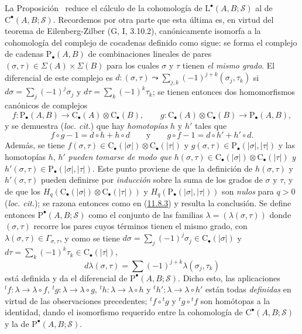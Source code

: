 \begin{env}[11.8.6]
\label{0.11.8.6}
\label{0.11.8.6-fr}
La Proposición~ reduce el cálculo de la cohomología de
$\mathrm L^\bullet(A,B;\mathscr S)$ al de
$\mathrm C^\bullet(A,B;\mathscr S)$. Recordemos por otra parte que esta última es, en virtud del teorema de Eilenberg-Zilber (G, I, 3.10.2), canónicamente isomorfa a la cohomología del complejo de cocadenas definido como sigue: se forma el complejo de cadenas $\mathrm P_\bullet(A,B)$ de combinaciones lineales de pares
$(\sigma,\tau)\in\Sigma(A)\times\Sigma(B)$ para los cuales $\sigma$ y
$\tau$ tienen \emph{el mismo grado}.
El diferencial de este complejo es
$d:(\sigma,\tau)\leadsto\sum_{j,k}(-1)^{j+k}(\sigma_j,\tau_k)$ si $d\sigma=\sum_j(-1)^j\sigma_j$ y $d\tau=\sum_k(-1)^k\tau_k$; se tienen entonces dos homomorfismos canónicos de complejos
\[
f:\mathrm P_\bullet(A,B)\longrightarrow
\mathrm C_\bullet(A)\otimes\mathrm C_\bullet(B),\qquad
g:\mathrm C_\bullet(A)\otimes\mathrm C_\bullet(B)
\longrightarrow\mathrm P_\bullet(A,B),
\] y se demuestra (\emph{loc. cit.}) que hay \emph{homotopías} $h$ y $h'$ tales que
\[
f\circ g-1=d\circ h+h\circ d\qquad\text{y}\qquad
g\circ f-1=d\circ h'+h'\circ d.
\]
Además, se tiene $f(\sigma,\tau)\in\mathrm C_\bullet(|\sigma|)
\otimes\mathrm C_\bullet(|\tau|)$ y $g(\sigma,\tau)\in\mathrm P_\bullet(|\sigma|,|\tau|)$ y las homotopías $h$, $h'$ \emph{pueden tomarse de modo que} $h(\sigma,\tau)\in\mathrm C_\bullet(|\sigma|)
\otimes\mathrm C_\bullet(|\tau|)$ \emph{y} $h'(\sigma,\tau)\in\mathrm P_\bullet(|\sigma|,|\tau|)$. Este punto proviene de que la definición de $h(\sigma,\tau)$ y $h'(\sigma,\tau)$ pueden definirse por
\emph{inducción} sobre la suma de los grados de $\sigma$ y $\tau$, y de que los $H_q(\mathrm C_\bullet(|\sigma|)\otimes\mathrm C_\bullet(|\tau|))$ y $H_q(\mathrm P_\bullet(|\sigma|,|\tau|))$ son \emph{nulos} para $q>0$ (\emph{loc. cit.}); se razona entonces como en (\hyperref[0.11.8.3-fr]{11.8.3}) y resulta la conclusión. Se define entonces $\mathrm P^\bullet(A,B;\mathscr S)$ como el conjunto de las familias $\lambda=(\lambda(\sigma,\tau))$ donde $(\sigma,\tau)$ recorre los pares cuyos términos tienen el mismo grado, con $\lambda(\sigma,\tau)\in\Gamma_{\sigma,\tau}$, y como se tiene $d\sigma=\sum_j(-1)^j\sigma_j\in\mathrm C_\bullet(|\sigma|)$ y $d\tau=\sum_k(-1)^k\tau_k\in\mathrm C_\bullet(|\tau|)$,
\[
d\lambda(\sigma,\tau)=
\sum(-1)^{j+k}\lambda(\sigma_j,\tau_k)
\]
está definida y da el diferencial de
$\mathrm P^\bullet(A,B;\mathscr S)$. Dicho esto, las aplicaciones ${}^tf:\lambda\to\lambda\circ f$, ${}^tg:\lambda\to\lambda\circ g$, ${}^th:\lambda\to\lambda\circ h$ y ${}^th':\lambda\to\lambda\circ h'$ están todas \emph{definidas} en virtud de las observaciones precedentes;
${}^tf\circ{}^tg$ y ${}^tg\circ{}^tf$ son homótopas a la
identidad, dando el isomorfismo requerido entre la cohomología de
$\mathrm C^\bullet(A,B;\mathscr S)$ y la de
$\mathrm P^\bullet(A,B;\mathscr S)$.
\end{env}

